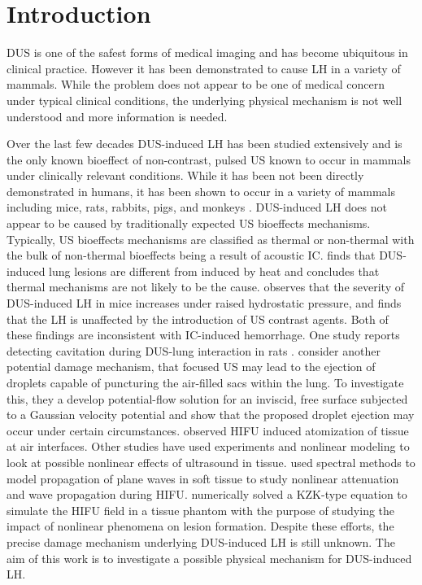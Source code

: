 \section{Introduction}%
\label{sec:introduction}%
% 
\ac{DUS} is one of the safest forms of medical imaging and has become
ubiquitous in clinical practice. However it has been demonstrated to
cause \ac{LH} in a variety of mammals. While the problem does not
appear to be one of medical concern under typical clinical conditions,
the underlying physical mechanism is not well understood and more
information is needed. 

Over the last few decades \ac{DUS}-induced \ac{LH} has been studied
extensively and is the only known bioeffect of non-contrast, pulsed
\ac{US} known to occur in mammals under clinically relevant
conditions. While it has been not been directly demonstrated in
humans, it has been shown to occur in a variety of mammals including
mice, rats, rabbits, pigs, and monkeys
\citep{Child1990,OBrien2006a,Tarantal1994a,Miller2012}.
\ac{DUS}-induced \ac{LH} does not appear to be caused by traditionally
expected \ac{US} bioeffects mechanisms. Typically, \ac{US} bioeffects
mechanisms are classified as thermal or non-thermal with the bulk of
non-thermal bioeffects being a result of acoustic
\ac{IC}. \cite{Zachary2006} finds that \ac{DUS}-induced lung lesions
are different from induced by heat and concludes that thermal
mechanisms are not likely to be the cause. \cite{OBrien2000} observes
that the severity of \ac{DUS}-induced \ac{LH} in mice increases under
raised hydrostatic pressure, and \cite{Raeman1996} finds that the
\ac{LH} is unaffected by the introduction of \ac{US} contrast
agents. Both of these findings are inconsistent with \ac{IC}-induced
hemorrhage. One study reports detecting cavitation during
\ac{DUS}-lung interaction in rats \cite{Holland1996}. \cite{Tjan2007}
consider another potential damage mechanism, that focused \ac{US} may
lead to the ejection of droplets capable of puncturing the air-filled
sacs within the lung. To investigate this, they a develop
potential-flow solution for an inviscid, free surface subjected to a
Gaussian velocity potential and show that the proposed droplet
ejection may occur under certain circumstances. \cite{Simon2012}
observed \ac{HIFU} induced atomization of tissue at air
interfaces. Other studies have used experiments and nonlinear modeling
to look at possible nonlinear effects of ultrasound in
tissue. \cite{Khokhlova1997} used spectral methods to model
propagation of plane waves in soft tissue to study nonlinear
attenuation and wave propagation during
\ac{HIFU}. \cite{Khokhlova2005} numerically solved a KZK-type equation
to simulate the \ac{HIFU} field in a tissue phantom with the purpose
of studying the impact of nonlinear phenomena on lesion formation.
Despite these efforts, the precise damage mechanism underlying
\ac{DUS}-induced \ac{LH} is still unknown. The aim of this work is to
investigate a possible physical mechanism for \ac{DUS}-induced
\ac{LH}. 

